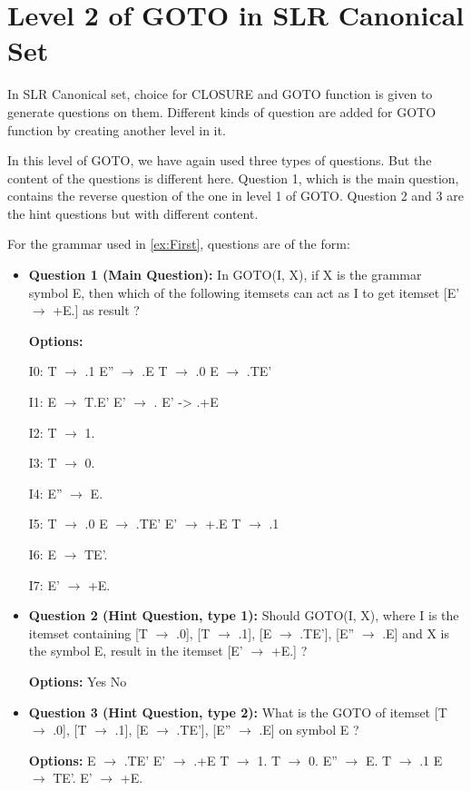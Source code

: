 \section{Level 2 of GOTO in SLR Canonical Set}
\label{sec:Goto Level 2}
In SLR Canonical set, choice for CLOSURE and GOTO function is given to generate questions on them. Different kinds of question are added for GOTO function by creating another level in it.

In this level of GOTO, we have again used three types of questions. But the content of the questions is different here. Question 1, which is the main question, contains the reverse question of the one in level 1 of GOTO. Question 2 and 3 are the hint questions but with different content.
\begin{example}
For the grammar used in \ref{ex:First}, questions are of the form:
\begin{itemize}
\item \textbf{Question 1 (Main Question):} In GOTO(I, X), if X is the grammar symbol E, then which of the following itemsets can act as I to get itemset {[E' $\to$ +E.]} as result ?

\textbf{Options:}

I0: T $\to$ .1 \quad E'' $\to$ .E \quad T $\to$ .0 \quad E $\to$ .TE'

I1: E $\to$ T.E' \quad E' $\to$ . \quad E' -> .+E

I2: T $\to$ 1.

I3: T $\to$ 0.

I4: E'' $\to$ E.

I5: T $\to$ .0 \quad E $\to$ .TE' \quad E' $\to$ +.E \quad T $\to$ .1

I6: E $\to$ TE'.    

I7: E' $\to$ +E.

\item \textbf{Question 2 (Hint Question, type 1):} Should GOTO(I, X), where I is the itemset containing {[T $\to$ .0], [T $\to$ .1], [E $\to$ .TE'], [E'' $\to$ .E]} and X is the symbol E, result in the itemset {[E' $\to$ +E.]} ?  

\textbf{Options:} Yes \quad No

\item \textbf{Question 3 (Hint Question, type 2):} What is the GOTO of itemset {[T $\to$ .0], [T $\to$ .1], [E $\to$ .TE'], [E'' $\to$ .E]} on symbol E ?

\textbf{Options:} E $\to$ .TE' \quad E' $\to$ .+E \quad T $\to$ 1. \quad T $\to$ 0. \quad E'' $\to$ E. \quad T $\to$ .1 \quad E $\to$ TE'. \quad E' $\to$ +E.
\end{itemize}
\end{example}

